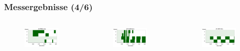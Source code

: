 \documentclass{beamer}
\begin{document}
\begin{frame}
	\frametitle{Messergebnisse (4/6)}
	\begin{columns}
		\begin{figure}
			\includegraphics[width=0.9\textwidth]{img/hum23.png} 
		\end{figure}
		\begin{figure}
			\includegraphics[width=0.9\textwidth]{img/hum25.png}
		\end{figure}
		\begin{figure}
			\includegraphics[width=0.9\textwidth]{img/hum24.png} 

\end{figure}
\end{columns}
\end{frame}
\end{document}
